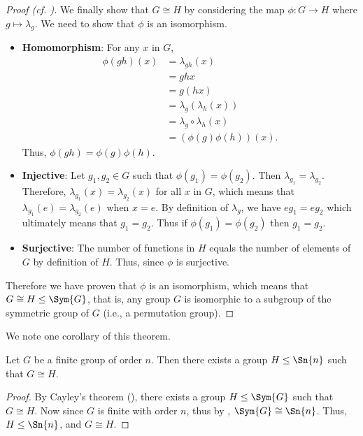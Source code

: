 \begin{proof}[Proof (cf. {\cite[Proof 2]{proofwiki_cayleytheorem}})]
    We finally show that $G \cong H$ by considering the map $\phi: G\to H$ where $g \mapsto \lambda_g$. We need to show that $\phi$ is an isomorphism.
    \begin{itemize}
        \item \textbf{Homomorphism}: For any $x$ in $G$,
            \begin{align*}
                \phi(gh)(x) &= \lambda_{gh}(x)\\
                &= ghx\\
                &= g(hx)\\
                &= \lambda_g\left(\lambda_h(x)\right)\\
                &= \lambda_g\circ\lambda_h(x)\\
                &= (\phi(g)\phi(h))(x).
            \end{align*}
            Thus, $\phi(gh) = \phi(g)\phi(h)$.
        
        \item \textbf{Injective}: Let $g_1, g_2 \in G$ such that $\phi(g_1) = \phi(g_2)$. Then $\lambda_{g_1} = \lambda_{g_2}$. Therefore, $\lambda_{g_1}(x) = \lambda_{g_2}(x)$ for all $x$ in $G$, which means that $\lambda_{g_1}(e) = \lambda_{g_2}(e)$ when $x = e$. By definition of $\lambda_g$, we have $eg_1 = eg_2$ which ultimately means that $g_1=g_2$. Thus if $\phi(g_1) = \phi(g_2)$ then $g_1=g_2$.
        
        \item \textbf{Surjective}: The number of functions in $H$ equals the number of elements of $G$ by definition of $H$. Thus, since $\phi$ is surjective.
    \end{itemize}
    Therefore we have proven that $\phi$ is an isomorphism, which means that $G \cong H \leq \Sym{G}$, that is, any group $G$ is isomorphic to a subgroup of the symmetric group of $G$ (i.e., a permutation group).
\end{proof}

We note one corollary of this theorem.
\begin{corollary}
    Let $G$ be a finite group of order $n$. Then there exists a group $H \leq \Sn{n}$ such that $G \cong H$.
\end{corollary}
\begin{proof}
    By Cayley's theorem (), there exists a group $H \leq \Sym{G}$ such that $G \cong H$. Now since $G$ is finite with order $n$, thus by , $\Sym{G} \cong \Sn{n}$. Thus, $H \leq \Sn{n}$, and $G \cong H$.
\end{proof}

